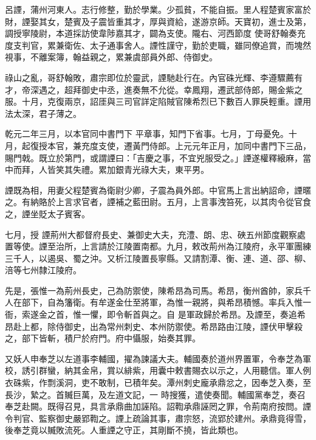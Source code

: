 \begin{pinyinscope}
 呂諲，蒲州河東人。志行修整，勤於學業。少孤貧，不能自振。里人程楚賓家富於財，諲娶其女，楚賓及子震皆重其才，厚與資給，遂游京師。天寶初，進士及第，調授寧陵尉，本道採訪使韋陟嘉其才，闢為支使。隴右、河西節度
 使哥舒翰奏充度支判官，累兼衛佐、太子通事舍人。諲性謹守，勤於吏職，雖同僚追賞，而塊然視事，不離案簿，翰益親之，累兼虞部員外郎、侍御史。



 祿山之亂，哥舒翰敗，肅宗即位於靈武，諲馳赴行在。內官硃光輝、李遵驟薦有才，帝深遇之，超拜御史中丞，進奏無不允從。幸鳳翔，遷武部侍郎，賜金紫之服。十月，克復兩京，詔厓與三司官詳定陷賊官陳希烈已下數百人罪戾輕重。諲用法太深，君子薄之。



 乾元二年三月，以本官同中書門下
 平章事，知門下省事。七月，丁母憂免。十月，起復授本官，兼充度支使，遷黃門侍郎。上元元年正月，加同中書門下三品，賜門戟。既立於第門，或謂諲曰：「吉慶之事，不宜兇服受之。」諲遂權釋縗麻，當中而拜，人皆笑其失禮。累加銀青光祿大夫，東平男。



 諲既為相，用妻父程楚賓為衛尉少卿，子震為員外郎。中官馬上言出納詔命，諲暱之。有納賂於上言求官者，諲補之藍田尉。五月，上言事洩笞死，以其肉令從官食之，諲坐貶太子賓客。



 七月，授
 諲荊州大都督府長史、兼御史大夫，充澧、朗、忠、硤五州節度觀察處置等使。諲至治所，上言請於江陵置南都。九月，敕改荊州為江陵府，永平軍團練三千人，以遏吳、蜀之沖。又析江陵置長寧縣。又請割潭、衡、連、道、邵、柳、涪等七州隸江陵府。



 先是，張惟一為荊州長史，己為防禦使，陳希昂為司馬。希昂，衡州酋帥，家兵千人在部下，自為籓衛。有牟遂金仕至將軍，為惟一親將，與希昂積憾。率兵入惟一衙，索遂金之首，惟一懼，即令斬首與之。自
 是軍政歸於希昂。及諲至，奏追希昂赴上都，除侍御史，出為常州刺史、本州防禦使。希昂路由江陵，諲伏甲擊殺之，部下皆斬，積尸於府門。府中懾服，始奏其罪。



 又妖人申奉芝以左道事李輔國，擢為諫議大夫。輔國奏於道州界置軍，令奉芝為軍校，誘引群蠻，納其金帛，賞以緋紫，用囊中敕書賜衣以示之，人用聽信。軍人例衣硃紫，作剽溪洞，吏不敢制，已積年矣。潭州刺史龐承鼎忿之，因奉芝入奏，至長沙，縶之。首贓巨萬，及左道文記，一
 時搜獲，遣使奏聞。輔國黨奉芝，奏召奉芝赴闕。既得召見，具言承鼎曲加誣陷。詔鞫承鼎誣罔之罪，令荊南府按問。諲令判官、監察御史嚴郢鞫之。諲上疏論其事，肅宗怒，流郢於建州。承鼎竟得雪，後奉芝竟以贓敗流死。人重諲之守正，其剛斷不撓，皆此類也。




\end{pinyinscope}
